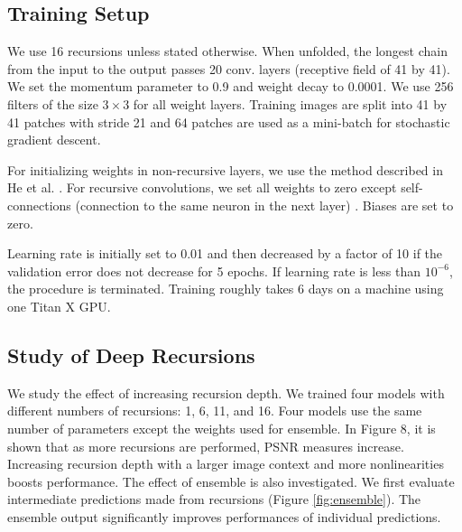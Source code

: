 \documentclass[10pt,twocolumn,letterpaper]{article}
\begin{document}
\subsection{Training Setup}
%
%
%
%
%
%

We use 16 recursions unless stated otherwise. When unfolded, the longest chain from the input to the output passes 20 conv. layers (receptive field of 41 by 41). We set the momentum parameter to 0.9 and weight decay to 0.0001. We use 256 filters of the size $3 \times 3$ for all weight layers. Training images are split into 41 by 41 patches with stride 21 and 64 patches are used as a mini-batch for stochastic gradient descent. 

For initializing weights in non-recursive layers, we use the method described in He et al. \cite{he2015delving}. For recursive convolutions, we set all weights to zero except self-connections (connection to the same neuron in the next layer) \cite{socher2012semantic, le2015simple}.  Biases are set to zero.

Learning rate is initially set to 0.01 and then decreased by a factor of 10 if the validation error does not decrease for 5 epochs. If learning rate is less than $10^{-6}$, the procedure is terminated. Training roughly takes 6 days on a machine using one Titan X GPU. 

\subsection{Study of Deep Recursions}
We study the effect of increasing recursion depth. We trained four models with different numbers of recursions: 1, 6, 11, and 16. Four models use the same number of parameters except the weights used for ensemble. In Figure {\color{red}8}, it is shown that as more recursions are performed, PSNR measures increase. Increasing recursion depth with a larger image context and more nonlinearities boosts performance. The effect of ensemble is also investigated. We first evaluate intermediate predictions made from recursions (Figure \ref{fig:ensemble}). The ensemble output significantly improves performances of individual predictions. 
\end{document}
